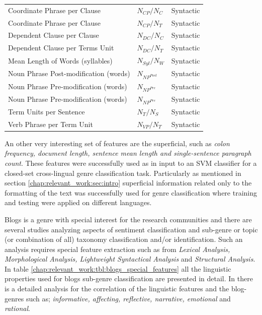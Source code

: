 \begin{table}[t]
\begin{tabular}{lll}
		Coordinate Phrase per Clause & $N_{CP}/N_{C}$ & Syntactic \\
		Coordinate Phrase per Clause & $N_{CP}/N_{T}$ & Syntactic \\
		Dependent Clause per Clause & $N_{DC}/N_{C}$ & Syntactic \\
		Dependent Clause per Terms Unit & $N_{DC}/N_{T}$ & Syntactic \\
		Mean Length of Words (syllables) & $N_{Syl}/N_{W}$ & Syntactic \\
		Noun Phrase Post-modification (words) & $N_{NP^{Post}}$ & Syntactic \\
		Noun Phrase Pre-modification (words) & $N_{NP^{Pre}}$ & Syntactic \\
		Noun Phrase Pre-modification (words) & $N_{NP^{Pre}}$ & Syntactic \\
		Term Units per Sentence & $N_{T}/N_{S}$ & Syntactic \\
		Verb Phrase per Term Unit &  $N_{VP}/N_{T}$ & Syntactic \\
		\hline
	\end{tabular}
\end{table}

 An other very interesting set of features are the superficial, such as \textit{colon frequency, document length, sentence mean length and single-sentence paragraph count}. These features were successfully used as in input to an SVM classifier for a closed-set cross-lingual genre classification task. Particularly as mentioned in section \ref{chap:relevant_work:sec:intro} superficial information related only to the formatting of the text was successfully used for genre classification where training and testing were applied on different languages\parencite{nguyen2019cross}.
 
Blogs is a genre with special interest for the research communities and there are several studies analyzing aspects of sentiment classification and sub-genre or topic (or combination of all) taxonomy classification and/or identification. Such an analysis requires special feature extraction such as from\textit{ Lexical Analysis, Morphological Analysis, Lightweight Syntactical Analysis} and \textit{Structural Analysis}. In table \ref{chap:relevant_work:tbl:blogs_special_features} all the linguistic properties used for blogs sub-genre classification are presented in detail. In \parencite{virik2017blog} there is a detailed analysis for the correlation of the linguistic features and the blog-genres such as; \textit{informative, affecting, reflective, narrative, emotional} and \textit{rational}.

